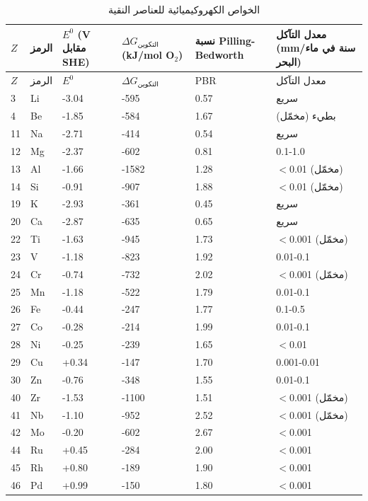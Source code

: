 \documentclass[11pt,a4paper]{article}
\begin{document}
\begin{otherlanguage}{arabic}
		\begin{longtable}{p{0.8cm}p{1.2cm}p{2.5cm}p{2.5cm}p{2.5cm}p{2.5cm}}
			\caption{الخواص الكهروكيميائية للعناصر النقية} \label{tab:electrochemical-properties-func} \\
			\toprule
			\(Z\) & الرمز & \(E^0\) (V مقابل SHE) & \(\Delta G_{\text{التكوين}}\) (kJ/mol O\(_2\)) & نسبة Pilling-Bedworth & معدل التآكل (mm/سنة في ماء البحر) \\
			\midrule
			\endfirsthead
			\toprule
			\(Z\) & الرمز & \(E^0\) & \(\Delta G_{\text{التكوين}}\) & PBR & معدل التآكل \\
			\midrule
			\endhead
			3  & Li & -3.04 & -595 & 0.57 & سريع \\
			4  & Be & -1.85 & -584 & 1.67 & بطيء (مخمّل) \\
			11 & Na & -2.71 & -414 & 0.54 & سريع \\
			12 & Mg & -2.37 & -602 & 0.81 & 0.1-1.0 \\
			13 & Al & -1.66 & -1582 & 1.28 & $<$0.01 (مخمّل) \\
			14 & Si & -0.91 & -907 & 1.88 & $<$0.01 (مخمّل) \\
			19 & K  & -2.93 & -361 & 0.45 & سريع \\
			20 & Ca & -2.87 & -635 & 0.65 & سريع \\
			22 & Ti & -1.63 & -945 & 1.73 & $<$0.001 (مخمّل) \\
			23 & V  & -1.18 & -823 & 1.92 & 0.01-0.1 \\
			24 & Cr & -0.74 & -732 & 2.02 & $<$0.001 (مخمّل) \\
			25 & Mn & -1.18 & -522 & 1.79 & 0.01-0.1 \\
			26 & Fe & -0.44 & -247 & 1.77 & 0.1-0.5 \\
			27 & Co & -0.28 & -214 & 1.99 & 0.01-0.1 \\
			28 & Ni & -0.25 & -239 & 1.65 & $<$0.01 \\
			29 & Cu & +0.34 & -147 & 1.70 & 0.001-0.01 \\
			30 & Zn & -0.76 & -348 & 1.55 & 0.01-0.1 \\
			40 & Zr & -1.53 & -1100 & 1.51 & $<$0.001 (مخمّل) \\
			41 & Nb & -1.10 & -952 & 2.52 & $<$0.001 (مخمّل) \\
			42 & Mo & -0.20 & -602 & 2.67 & $<$0.001 \\
			44 & Ru & +0.45 & -284 & 2.00 & $<$0.001 \\
			45 & Rh & +0.80 & -189 & 1.90 & $<$0.001 \\
			46 & Pd & +0.99 & -150 & 1.80 & $<$0.001 \\

\end{longtable}
\end{otherlanguage}
\end{document}

